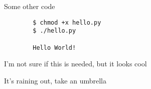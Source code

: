 \documentclass{article}
\begin{document}
Some other code

\begin{commandline}
	\begin{verbatim}
		$ chmod +x hello.py
		$ ./hello.py

		Hello World!
	\end{verbatim}
\end{commandline}

I'm not sure if this is needed, but it looks cool

\begin{warn}[Notice:]
It's raining out, take an umbrella
\end{warn}

\end{document}

